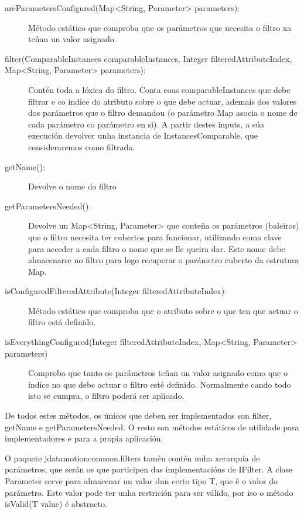 \begin{description}
\item[areParametersConfigured(Map\textless String, Parameter\textgreater{} parameters):] \hfill
Método estático que comproba que os parámetros que necesita o filtro xa teñan un valor asignado.
\item[filter(ComparableInstances comparableInstances, Integer filteredAttributeIndex, Map\textless String, Parameter\textgreater{} parameters):] \hfill
Contén toda a lóxica do filtro. Conta coas comparableInstances que debe filtrar e co índice do atributo sobre o que debe actuar, ademais dos valores dos parámetros que o filtro demandou (o parámetro Map asocia o nome de cada parámetro co parámetro en si). A partir destes inputs, a súa execución devolver unha instancia de InstancesComparable, que consideraremos como filtrada.
\item[getName():] \hfill
Devolve o nome do filtro
\item[getParametersNeeded():] \hfill
Devolve un Map\textless String, Parameter\textgreater{} que conteña os parámetros (baleiros) que o filtro necesita ter cubertos para funcionar, utilizando coma clave para acceder a cada filtro o nome que se lle queira dar. Este nome debe almacenarse no filtro para logo recuperar o parámetro cuberto da estrutura Map.
\item[isConfiguredFilteredAttribute(Integer filteredAttributeIndex):] \hfill
Método estático que comproba que o atributo sobre o que ten que actuar o filtro está definido.
\item[isEverythingConfigured(Integer filteredAttributeIndex, Map\textless String, Parameter\textgreater{} parameters)] \hfill
Comproba que tanto os parámetros teñan un valor asignado como que o índice no que debe actuar o filtro esté definido. Normalmente cando todo isto se cumpra, o filtro poderá ser aplicado.
\end{description}

De todos estes métodos, os únicos que deben ser implementados son filter, getName e getParametersNeeded. O resto son métodos estáticos de utilidade para implementadores e para a propia aplicación.

O paquete jdatamotioncommon.filters tamén contén unha xerarquía de parámetros, que serán os que participen das implementacións de IFilter. A clase Parameter serve para almacenar un valor dun certo tipo T, que é o valor do parámetro. Este valor pode ter unha restrición para ser válido, por iso o método isValid(T value) é abstracto.

